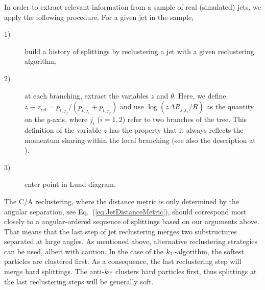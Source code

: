 In order to extract relevant information from a sample of real (simulated) jets, we apply the following procedure.
For a given jet in the sample,
\begin{description}
\item[1)] build a history of splittings by reclustering a jet with a given reclustering algorithm,
\item[2)] at each branching, extract the variables $z$ and $\theta$. Here, we define $z \equiv z_\text{rel} = p_{t,j_2}/(p_{t,j_1}+p_{t,j_2})$ and use $\log(z \Delta R_{j_1 j_2}/R)$ as the quantity on the $y$-axis, where $j_i$ ($i=1,2$) refer to two branches of the tree.
This definition of the variable $z$ has the property that it always reflects the momentum sharing within the local branching (see also the description at \cite{LundFromMC}).

\item[3)] enter point in Lund diagram.

\end{description}
The C/A reclustering, where the distance metric is only determined by the angular separation, see Eq.~(\ref{eq:JetDistanceMetric}), should correspond most closely to a angular-ordered sequence of splittings based on our arguments above. That means that the last step of jet reclustering merges two substructures separated at large angles.
As mentioned above, alternative reclustering strategies can be used, albeit with caution.
In the case of the $k_{\rm \tiny T}$-algorithm, the softest particles are clustered first. As a consequence, the last reclustering step will merge hard splittings. The anti-$k_{\rm \tiny T}$ clusters hard particles first, thus splittings at the last reclustering steps will be generally soft. 

